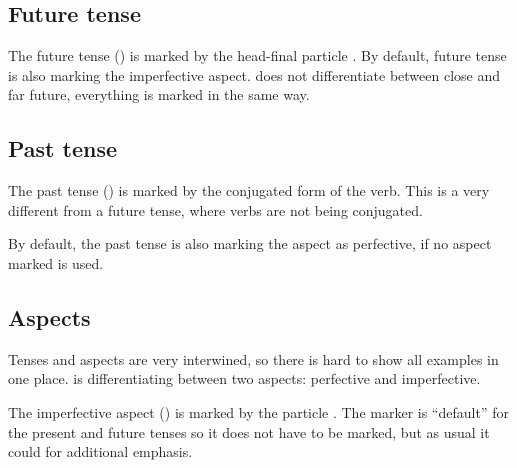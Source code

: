 \subsection{Future tense}

The future tense (\Fut{}) is marked by the head-final particle . By
default, future tense is also marking the imperfective aspect. \andro does not
differentiate between close and far future, everything is marked in the same
way.




\subsection{Past tense}

The past tense (\Pst{}) is marked by the conjugated form of the verb. This is a
very different from a future tense, where verbs are not being conjugated.


By default, the past tense is also marking the aspect as perfective, if no
aspect marked is used.

\subsection{Aspects}

Tenses and aspects are very interwined, so there is hard to show all examples in
one place. \andro is differentiating between two aspects: perfective and
imperfective.

The imperfective aspect (\Ipfv{}) is marked by the particle . The
marker is ``default'' for the present and future tenses so it does not have to
be marked, but as usual it could for additional emphasis.



